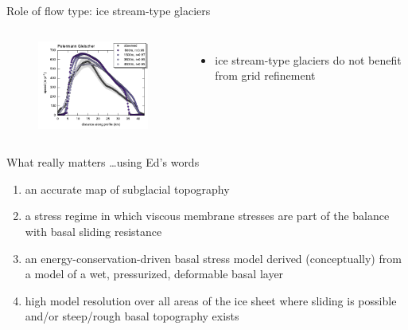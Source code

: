 \documentclass[hide notes,intlimits]{beamer}
\begin{document}
\begin{frame}{Role of flow type: ice stream-type glaciers}
  \begin{columns}
    \column[c]{5.5cm}
    \begin{figure}
      \includegraphics[width=5.5cm]{Petermann_Gletscher_velsurf_normal_profile_250m_greenland_2008-2009_grid_mo14_flow_sel_purple}
    \end{figure}
    \column[c]{6.5cm}
    \begin{itemize}
      \item ice stream-type glaciers do not benefit from grid refinement
    \end{itemize}
  \end{columns}
\end{frame}




\begin{frame}{What really matters  \ldots using Ed's words}
  \begin{enumerate}
    \item an accurate map of subglacial topography
    \item a stress regime in which viscous membrane stresses are part of the balance with basal sliding resistance
    \item an energy-conservation-driven basal stress model derived (conceptually) from a model of a wet, pressurized, deformable basal layer
    \item  high model resolution over all areas of the ice sheet where sliding is possible and/or steep/rough basal topography exists
  \end{enumerate}
\end{frame}
\end{document}

